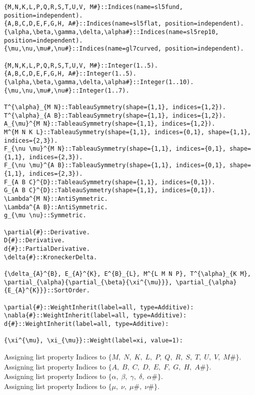 \documentclass[11pt]{article}
\begin{document}
{\color[named]{Blue}\begin{verbatim}
{M,N,K,L,P,Q,R,S,T,U,V, M#}::Indices(name=sl5fund, position=independent).
{A,B,C,D,E,F,G,H, A#}::Indices(name=sl5flat, position=independent).
{\alpha,\beta,\gamma,\delta,\alpha#}::Indices(name=sl5rep10, position=independent).
{\mu,\nu,\mu#,\nu#}::Indices(name=gl7curved, position=independent).

{M,N,K,L,P,Q,R,S,T,U,V, M#}::Integer(1..5).
{A,B,C,D,E,F,G,H, A#}::Integer(1..5).
{\alpha,\beta,\gamma,\delta,\alpha#}::Integer(1..10).
{\mu,\nu,\mu#,\nu#}::Integer(1..7).

T^{\alpha}_{M N}::TableauSymmetry(shape={1,1}, indices={1,2}).
T^{\alpha}_{A B}::TableauSymmetry(shape={1,1}, indices={1,2}).
A_{\mu}^{M N}::TableauSymmetry(shape={1,1}, indices={1,2}).
M^{M N K L}::TableauSymmetry(shape={1,1}, indices={0,1}, shape={1,1}, indices={2,3}).
F_{\nu \mu}^{M N}::TableauSymmetry(shape={1,1}, indices={0,1}, shape={1,1}, indices={2,3}).
F_{\nu \mu}^{A B}::TableauSymmetry(shape={1,1}, indices={0,1}, shape={1,1}, indices={2,3}).
F_{A B C}^{D}::TableauSymmetry(shape={1,1}, indices={0,1}).
G_{A B C}^{D}::TableauSymmetry(shape={1,1}, indices={0,1}).
\Lambda^{M N}::AntiSymmetric.
\Lambda^{A B}::AntiSymmetric.
g_{\mu \nu}::Symmetric.

\partial{#}::Derivative.
D{#}::Derivative.
d{#}::PartialDerivative.
\delta{#}::KroneckerDelta.

{\delta_{A}^{B}, E_{A}^{K}, E^{B}_{L}, M^{L M N P}, T^{\alpha}_{K M},  \partial_{\alpha}{\partial_{\beta}{\xi^{\mu}}}, \partial_{\alpha}{E_{A}^{K}}}::SortOrder.

\partial{#}::WeightInherit(label=all, type=Additive):
\nabla{#}::WeightInherit(label=all, type=Additive):
d{#}::WeightInherit(label=all, type=Additive):

{\xi^{\mu}, \xi_{\mu}}::Weight(label=xi, value=1):
\end{verbatim}}
Assigning list property Indices to $\{M,\; N,\; K,\; L,\; P,\; Q,\; R,\; S,\; T,\; U,\; V,\; M\#\}$.
\\
Assigning list property Indices to $\{A,\; B,\; C,\; D,\; E,\; F,\; G,\; H,\; A\#\}$.
\\
Assigning list property Indices to $\{\alpha,\; \beta,\; \gamma,\; \delta,\; \alpha\#\}$.
\\
Assigning list property Indices to $\{\mu,\; \nu,\; \mu\#,\; \nu\#\}$.
\\
\end{document}
